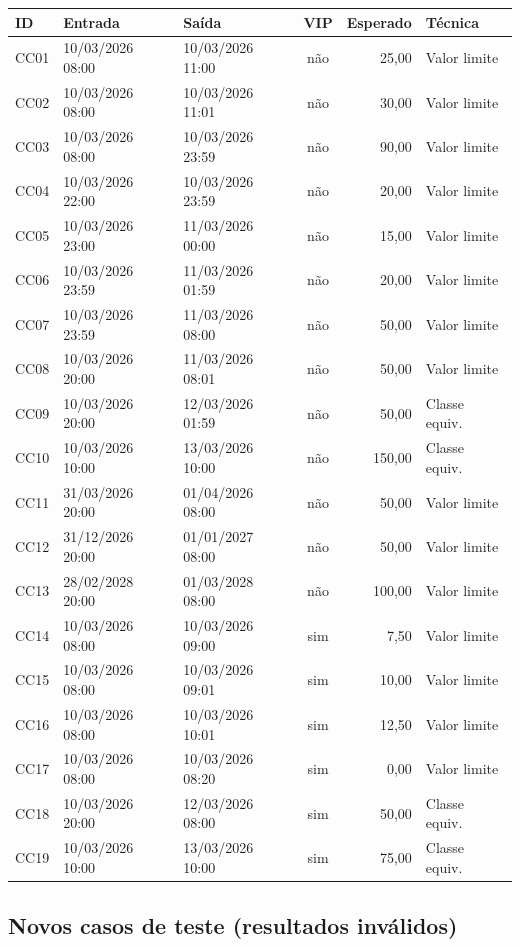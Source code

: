 \documentclass[11pt,a4paper]{article}
\begin{document}
\small
\begin{longtable}{@{}l p{4.2cm} p{3.0cm} c r p{2.4cm}@{}}
\toprule
ID & Entrada & Saída & VIP & Esperado & Técnica \\
\midrule
\endhead
CC01 & 10/03/2026 08:00 & 10/03/2026 11:00 & não & 25,00 & Valor limite \\
CC02 & 10/03/2026 08:00 & 10/03/2026 11:01 & não & 30,00 & Valor limite \\
CC03 & 10/03/2026 08:00 & 10/03/2026 23:59 & não & 90,00 & Valor limite \\
CC04 & 10/03/2026 22:00 & 10/03/2026 23:59 & não & 20,00 & Valor limite \\
CC05 & 10/03/2026 23:00 & 11/03/2026 00:00 & não & 15,00 & Valor limite \\
CC06 & 10/03/2026 23:59 & 11/03/2026 01:59 & não & 20,00 & Valor limite \\
CC07 & 10/03/2026 23:59 & 11/03/2026 08:00 & não & 50,00 & Valor limite \\
CC08 & 10/03/2026 20:00 & 11/03/2026 08:01 & não & 50,00 & Valor limite \\
CC09 & 10/03/2026 20:00 & 12/03/2026 01:59 & não & 50,00 & Classe equiv. \\
CC10 & 10/03/2026 10:00 & 13/03/2026 10:00 & não & 150,00 & Classe equiv. \\
CC11 & 31/03/2026 20:00 & 01/04/2026 08:00 & não & 50,00 & Valor limite \\
CC12 & 31/12/2026 20:00 & 01/01/2027 08:00 & não & 50,00 & Valor limite \\
CC13 & 28/02/2028 20:00 & 01/03/2028 08:00 & não & 100,00 & Valor limite \\
CC14 & 10/03/2026 08:00 & 10/03/2026 09:00 & sim & 7,50 & Valor limite \\
CC15 & 10/03/2026 08:00 & 10/03/2026 09:01 & sim & 10,00 & Valor limite \\
CC16 & 10/03/2026 08:00 & 10/03/2026 10:01 & sim & 12,50 & Valor limite \\
CC17 & 10/03/2026 08:00 & 10/03/2026 08:20 & sim & 0,00 & Valor limite \\
CC18 & 10/03/2026 20:00 & 12/03/2026 08:00 & sim & 50,00 & Classe equiv. \\
CC19 & 10/03/2026 10:00 & 13/03/2026 10:00 & sim & 75,00 & Classe equiv. \\
\bottomrule
\end{longtable}
\normalsize

\subsection{Novos casos de teste (resultados inválidos)}
\end{document}
